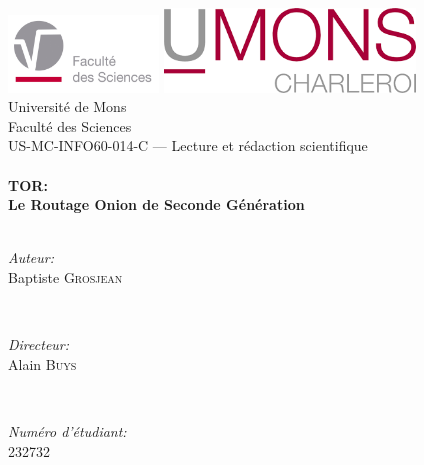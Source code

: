 
\begin{titlepage}

	\begin{center}
	\includegraphics[width=0.3\textwidth]{./Images/Logos/fs.pdf}\hfill
	\includegraphics[width=0.5\textwidth]{./Images/Logos/umons_charleroi.png}\\[1cm]
	
	{\LARGE Université de Mons}\\[0.5cm]
	{\Large Faculté des Sciences}\\[1cm]
	
	{\Large US-MC-INFO60-014-C — Lecture et rédaction scientifique}\\[1cm]
	
	\HRule \\[0.4cm]
	{ \Huge \bfseries TOR:}\\[0.2cm]
	{ \LARGE \bfseries Le Routage Onion de Seconde Génération}\\[0.4cm]
	\HRule \\[1.5cm]
	
	\begin{minipage}{0.4\textwidth}
	\begin{flushleft} \large
	\emph{Auteur:}\\
	Baptiste \textsc{Grosjean}
	\end{flushleft}
	\end{minipage}
	~
	\begin{minipage}{0.4\textwidth}
	\begin{flushright} \large
	\emph{Directeur:}\\
	Alain \textsc{Buys}
	\end{flushright}
	\end{minipage}\\[2cm]
	
	\begin{minipage}{0.4\textwidth}
	\begin{flushleft} \large
	\emph{Numéro d'étudiant:}\\
	232732
	\end{flushleft}
	\end{minipage}\\[2cm]
	

\end{center}
\end{titlepage}
